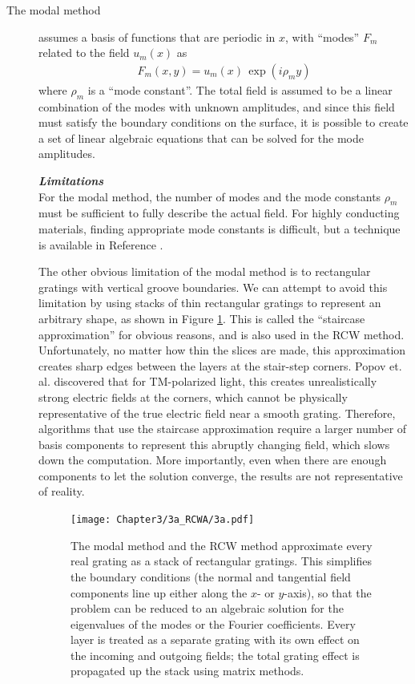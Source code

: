 \begin{description}
\item[The modal method] assumes a basis of functions that are periodic in $x$, with ``modes'' $F_m$ related to the field $u_m(x)$ as
\begin{align}
F_m(x,y)=u_m(x) \, \exp \left( i \rho_m y \right)
\end{align}
where $\rho_m$ is a ``mode constant''.  The total field is assumed to be a linear combination of the modes with unknown amplitudes, and since this field must satisfy the boundary conditions on the surface, it is possible to create a set of linear algebraic equations that can be solved for the mode amplitudes.
 
\noindent\textbf{\emph{Limitations}}\\
For the modal method, the number of modes and the mode constants $\rho_m$ must be sufficient to fully describe the actual field.  For highly conducting materials, finding appropriate mode constants is difficult, but a technique is available in Reference \cite{And81}.  
 
The other obvious limitation of the modal method is to rectangular gratings with vertical groove boundaries.  We can attempt to avoid this limitation by using stacks of thin rectangular gratings to represent an arbitrary shape, as shown in Figure \ref{3a}.  This is called the ``staircase approximation'' for obvious reasons, and is also used in the RCW method.  Unfortunately, no matter how thin the slices are made, this approximation creates sharp edges between the layers at the stair-step corners.  Popov et. al. discovered that for TM-polarized light, this creates unrealistically strong electric fields at the corners, which cannot be physically representative of the true electric field near a smooth grating.  Therefore, algorithms that use the staircase approximation require a larger number of basis components to represent this abruptly changing field, which slows down the computation.  More importantly, even when there are enough components to let the solution converge, the results are not representative of reality. \cite{Pop02} 
 
\begin{figure}[tbp] %
   \centering
   \texttt{[image: Chapter3/3a\_RCWA/3a.pdf]} 
   \caption[The modal method and the RCW method approximate every real grating as a stack of rectangular gratings.]{The modal method and the RCW method approximate every real grating as a stack of rectangular gratings.  This simplifies the boundary conditions (the normal and tangential field components line up either along the $x$- or $y$-axis), so that the problem can be reduced to an algebraic solution for the eigenvalues of the modes or the Fourier coefficients.  Every layer is treated as a separate grating with its own effect on the incoming and outgoing fields; the total grating effect is propagated up the stack using matrix methods.}
   \label{3a}
\end{figure}
 

\end{description}
